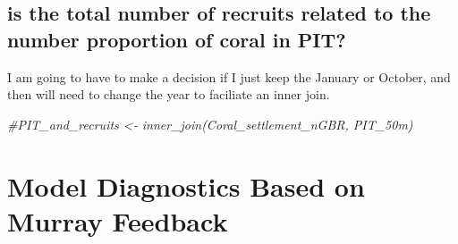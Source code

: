 \documentclass[
]{article}
\newenvironment{Shaded}{\begin{snugshade}}{\end{snugshade}}
\newcommand{\CommentTok}[1]{\textcolor[rgb]{0.56,0.35,0.01}{\textit{#1}}}
\begin{document}
\subsection{is the total number of recruits related to the number
proportion of coral in
PIT?}\label{is-the-total-number-of-recruits-related-to-the-number-proportion-of-coral-in-pit}

I am going to have to make a decision if I just keep the January or
October, and then will need to change the year to faciliate an inner
join.

\begin{Shaded}
\begin{Highlighting}[]
\CommentTok{\#PIT\_and\_recruits \textless{}{-} inner\_join(Coral\_settlement\_nGBR, PIT\_50m)}
\end{Highlighting}
\end{Shaded}

\section{Model Diagnostics Based on Murray
Feedback}\label{model-diagnostics-based-on-murray-feedback}
\end{document}
